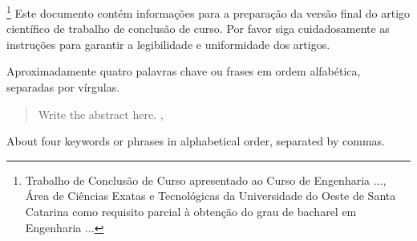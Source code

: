  \vspace{0.3cm}
  \begin{resumo}
    \noindent\footnote{Trabalho de Conclusão de Curso apresentado ao Curso de Engenharia ..., Área de Ciências Exatas e Tecnológicas da Universidade do Oeste de Santa Catarina como requisito parcial à obtenção do grau de bacharel em Engenharia ...}
     Este documento contém informações para a preparação da versão final do artigo científico de trabalho de conclusão de curso. Por favor siga cuidadosamente as instruções para garantir a legibilidade e uniformidade dos artigos.
    \lipsum[1-1]
    
  \end{resumo}
  
  \begin{palavraschave}
    
    Aproximadamente quatro palavras chave ou frases em ordem alfabética, separadas por vírgulas.
  \end{palavraschave}
  
  \vspace{0.5cm}
  
  \begin{abstract}
  \noindent Write the abstract here. ,
    \lipsum[1-1]
  \end{abstract}

  \begin{IEEEkeywords}
    About four keywords or phrases in alphabetical order, separated by commas.
  \end{IEEEkeywords}
  
    \vspace{0.5cm}